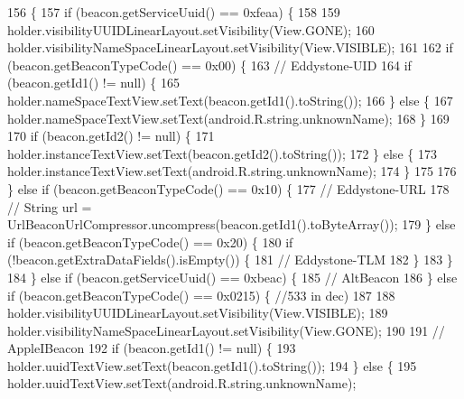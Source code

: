 \begin{DoxyCode}
156                                                                        \{
157         \textcolor{keywordflow}{if} (beacon.getServiceUuid() == 0xfeaa) \{
158 
159             holder.visibilityUUIDLinearLayout.setVisibility(View.GONE);
160             holder.visibilityNameSpaceLinearLayout.setVisibility(View.VISIBLE);
161 
162             \textcolor{keywordflow}{if} (beacon.getBeaconTypeCode() == 0x00) \{
163                 \textcolor{comment}{// Eddystone-UID}
164                 \textcolor{keywordflow}{if} (beacon.getId1() != null) \{
165                     holder.nameSpaceTextView.setText(beacon.getId1().toString());
166                 \} \textcolor{keywordflow}{else} \{
167                     holder.nameSpaceTextView.setText(android.R.string.unknownName);
168                 \}
169 
170                 \textcolor{keywordflow}{if} (beacon.getId2() != null) \{
171                     holder.instanceTextView.setText(beacon.getId2().toString());
172                 \} \textcolor{keywordflow}{else} \{
173                     holder.instanceTextView.setText(android.R.string.unknownName);
174                 \}
175 
176             \} \textcolor{keywordflow}{else} \textcolor{keywordflow}{if} (beacon.getBeaconTypeCode() == 0x10) \{
177                 \textcolor{comment}{// Eddystone-URL}
178                 \textcolor{comment}{// String url = UrlBeaconUrlCompressor.uncompress(beacon.getId1().toByteArray());}
179             \} \textcolor{keywordflow}{else} \textcolor{keywordflow}{if} (beacon.getBeaconTypeCode() == 0x20) \{
180                 \textcolor{keywordflow}{if} (!beacon.getExtraDataFields().isEmpty()) \{
181                     \textcolor{comment}{// Eddystone-TLM}
182                 \}
183             \}
184         \} \textcolor{keywordflow}{else} \textcolor{keywordflow}{if} (beacon.getServiceUuid() == 0xbeac) \{
185             \textcolor{comment}{// AltBeacon}
186         \} \textcolor{keywordflow}{else} \textcolor{keywordflow}{if} (beacon.getBeaconTypeCode() == 0x0215) \{ \textcolor{comment}{//533 in dec)}
187 
188             holder.visibilityUUIDLinearLayout.setVisibility(View.VISIBLE);
189             holder.visibilityNameSpaceLinearLayout.setVisibility(View.GONE);
190 
191             \textcolor{comment}{// AppleIBeacon}
192             \textcolor{keywordflow}{if} (beacon.getId1() != null) \{
193                 holder.uuidTextView.setText(beacon.getId1().toString());
194             \} \textcolor{keywordflow}{else} \{
195                 holder.uuidTextView.setText(android.R.string.unknownName);

\end{DoxyCode}
